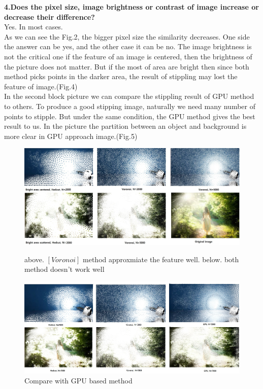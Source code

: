 \documentclass[11pt]{article}
\begin{document}
\textbf{4.Does the pixel size, image brightness or contrast of image increase or decrease their difference?}\\
Yes. In most cases.\\
As we can see the Fig.2, the bigger pixel size the similarity decreases. One side the answer can be yes, and the other case it can be no. The image brightness is not the critical one if the feature of an image is centered, then the brightness of the picture does not matter. But if the most of area are bright then since both method picks points in the darker area, the result of stippling may lost the feature of image.(Fig.4) \\
In the second block picture we can compare the stippling result of GPU method to others. To produce a good stipping image, naturally we need many number of points to stipple. But under the same condition, the GPU method gives the best result to us. In the picture the partition between an object and background is more clear in GPU approach image.(Fig.5)

\begin{figure}[h]
\center
  \includegraphics[width=140mm]{compare4.jpg}
  \caption{above. $[Voronoi]$ method approxmiate the feature well. below. both method doesn't work well}\label{compare1h}
  \includegraphics[width=140mm]{compare4(2).jpg}
  \caption{Compare with GPU based method}\label{GPU1}
\end{figure}
\end{document}
